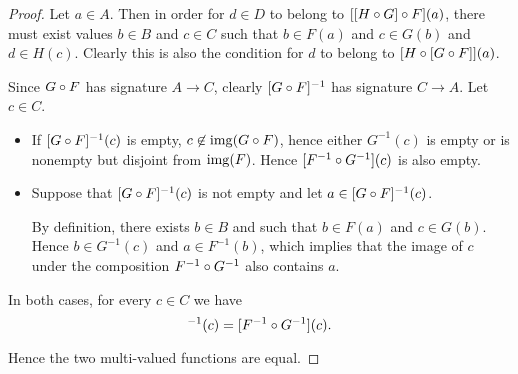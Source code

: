 \begin{proof}
   Let \( a \in A \). Then in order for \( d \in D \) to belong to \( [[H \mathbin \circ G] \mathbin \circ F](a) \), there must exist values \( b \in B \) and \( c \in C \) such that \( b \in F(a) \) and \( c \in G(b) \) and \( d \in H(c) \). Clearly this is also the condition for \( d \) to belong to \( [H \mathbin \circ [G \mathbin \circ F]](a) \).

   Since \( G \mathbin \circ F \) has signature \( A \to C \), clearly \( [G \mathbin \circ F]^{-1} \) has signature \( C \to A \). Let \( c \in C \).

  \begin{itemize}
    \item If \( [G \mathbin \circ F]^{-1}(c) \) is empty, \( c \not\in \operatorname{img}(G \mathbin \circ F) \), hence either \( G^{-1}(c) \) is empty or is nonempty but disjoint from \( \operatorname{img}(F) \). Hence \( [F^{-1} \mathbin \circ G^{-1}](c) \) is also empty.

    \item Suppose that \( [G \mathbin \circ F]^{-1}(c) \) is not empty and let \( a \in [G \mathbin \circ F]^{-1}(c) \).

    By definition, there exists \( b \in B \) and such that \( b \in F(a) \) and \( c \in G(b) \). Hence \( b \in G^{-1}(c) \) and \( a \in F^{-1}(b) \), which implies that the image of \( c \) under the composition \( F^{-1} \mathbin \circ G^{-1} \) also contains \( a \).
  \end{itemize}

  In both cases, for every \( c \in C \) we have
  \begin{equation*}
    [G \bincirc F]^{-1}(c) = [F^{-1} \bincirc G^{-1}](c).
  \end{equation*}

  Hence the two multi-valued functions are equal.
\end{proof}

